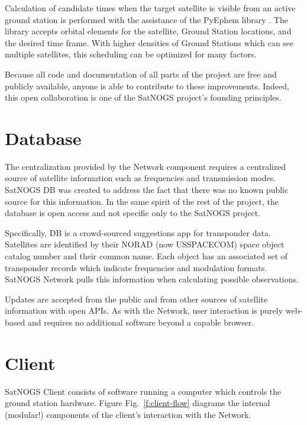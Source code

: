 \documentclass[conference]{IEEEtran}
\newcommand{\figref}[1]{Fig.~\ref{#1}}
\begin{document}
Calculation of candidate times when the target satellite is visible from an active ground station is performed with the assistance of the PyEphem library \cite{PyEphem}.
The library accepts orbital elements for the satellite, Ground Station locations, and the desired time frame.
With higher densities of Ground Stations which can see multiple satellites, this scheduling can be optimized for many factors.

Because all code and documentation of all parts of the project are free and publicly available, anyone is able to contribute to these improvements.
Indeed, this open collaboration is one of the SatNOGS project's founding principles.


\section{Database}
The centralization provided by the Network component requires a centralized source of satellite information such as frequencies and transmission modes.
SatNOGS DB was created to address the fact that there was no known public source for this information.
In the same spirit of the rest of the project, the database is open access and not specific only to the SatNOGS project.

Specifically, DB is a crowd-sourced suggestions app for transponder data.
Satellites are identified by their NORAD (now USSPACECOM) space object catalog number and their common name.
Each object has an associated set of transponder records which indicate frequencies and modulation formats.
SatNOGS Network pulls this information when calculating possible observations.

Updates are accepted from the public and from other sources of satellite information with open APIs.
As with the Network, user interaction is purely web-based and requires no additional software beyond a capable browser.


\section{Client}
SatNOGS Client consists of software running a computer which controls the ground station hardware.
Figure \figref{f:client-flow} diagrams the internal (modular!) components of the client's interaction with the Network.
\end{document}
